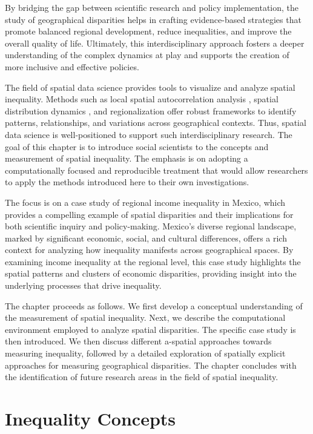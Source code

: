 \documentclass[
  a4paper, 
  twoside,
  final
]{article}
\begin{document}
By bridging the gap between scientific research and policy
implementation, the study of geographical disparities helps in crafting
evidence-based strategies that promote balanced regional development,
reduce inequalities, and improve the overall quality of life.
Ultimately, this interdisciplinary approach fosters a deeper
understanding of the complex dynamics at play and supports the creation
of more inclusive and effective policies.

The field of spatial data science \citep{rey2023GeographicData} provides
tools to visualize and analyze spatial inequality. Methods such as local
spatial autocorrelation analysis \citep{anselin1995LocalIndicators},
spatial distribution dynamics \citep{rey2015DiscreteRegionala}, and
regionalization \citep{wei2020EfficientRegionalization} offer robust
frameworks to identify patterns, relationships, and variations across
geographical contexts. Thus, spatial data science is well-positioned to
support such interdisciplinary research. The goal of this chapter is to
introduce social scientists to the concepts and measurement of spatial
inequality. The emphasis is on adopting a computationally focused and
reproducible treatment that would allow researchers to apply the methods
introduced here to their own investigations.

The focus is on a case study of regional income inequality in Mexico,
which provides a compelling example of spatial disparities and their
implications for both scientific inquiry and policy-making. Mexico's
diverse regional landscape, marked by significant economic, social, and
cultural differences, offers a rich context for analyzing how inequality
manifests across geographical spaces. By examining income inequality at
the regional level, this case study highlights the spatial patterns and
clusters of economic disparities, providing insight into the underlying
processes that drive inequality.

The chapter proceeds as follows. We first develop a conceptual
understanding of the measurement of spatial inequality. Next, we
describe the computational environment employed to analyze spatial
disparities. The specific case study is then introduced. We then discuss
different a-spatial approaches towards measuring inequality, followed by
a detailed exploration of spatially explicit approaches for measuring
geographical disparities. The chapter concludes with the identification
of future research areas in the field of spatial inequality.

\section{Inequality Concepts}\label{inequality-concepts}
\end{document}
